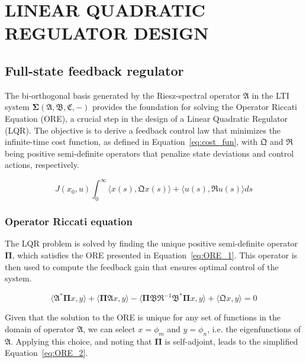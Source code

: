 \section{LINEAR QUADRATIC REGULATOR DESIGN}

\subsection{Full-state feedback regulator}

The bi-orthogonal basis generated by the Riesz-spectral operator $\mathfrak{A}$ in the LTI system $\mathbf{\Sigma(\mathfrak{A},\mathfrak{B},\mathfrak{C},-)}$ provides the foundation for solving the Operator Riccati Equation (ORE), a crucial step in the design of a Linear Quadratic Regulator (LQR). The objective is to derive a feedback control law that minimizes the infinite-time cost function, as defined in Equation~\ref{eq:cost_fun}, with $\mathfrak{Q}$ and $\mathfrak{R}$ being positive semi-definite operators that penalize state deviations and control actions, respectively.

\begin{equation} \label{eq:cost_fun}
    J(x_0, u) \int_0^{\infty} \langle x(s), \mathfrak{Q} x(s)\rangle + \langle u(s), \mathfrak{R} u(s)\rangle ds
\end{equation}

\subsubsection{Operator Riccati equation}

The LQR problem is solved by finding the unique positive semi-definite operator $\mathbf{\Pi}$, which satisfies the ORE presented in Equation~\ref{eq:ORE_1}. This operator is then used to compute the feedback gain that ensures optimal control of the system.

\begin{equation} \label{eq:ORE_1}
    \langle \mathfrak{A}^* \mathbf{\Pi} x, y\rangle + \langle \mathbf{\Pi} \mathfrak{A} x, y \rangle - \langle \mathbf{\Pi} \mathfrak{B} \mathfrak{R}^{-1} \mathfrak{B}^* \mathbf{\Pi} x, y\rangle + \langle \mathfrak{Q} x, y\rangle = 0
\end{equation}

Given that the solution to the ORE is unique for any set of functions in the domain of operator $\mathfrak{A}$, we can select $x = \phi_m$ and $y = \phi_n$, i.e. the eigenfunctions of $\mathfrak{A}$. Applying this choice, and noting that $\mathbf{\Pi}$ is self-adjoint, leads to the simplified Equation~\ref{eq:ORE_2}.

